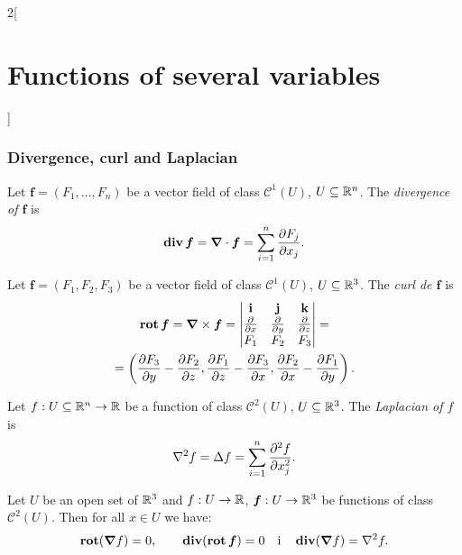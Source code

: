 \documentclass[../../../main.tex]{subfiles}
\begin{document}
\begin{multicols}{2}[\section{Functions of several variables}]
    \subsubsection*{Divergence, curl and Laplacian}
    \begin{definition}
        Let $\boldsymbol{f}=(F_1,\ldots, F_n)$ be a vector field of class $\mathcal{C}^1(U)$, $U\subseteq\mathbb{R}^n$. The \textit{divergence of $\boldsymbol{f}$} is $$\operatorname{\vb{div}}\boldsymbol{f}=\grad\cdot\boldsymbol{f}=\sum_{i=1}^n\frac{\partial F_j}{\partial x_j}.$$
    \end{definition}
    \begin{definition}
        Let $\boldsymbol{f}=(F_1,F_2,F_3)$ be a vector field of class $\mathcal{C}^1(U)$, $U\subseteq\mathbb{R}^3$. The \textit{curl de $\boldsymbol{f}$} is \begin{multline*}
            \operatorname{\vb{rot}}\boldsymbol{f}=\grad\times\boldsymbol{f}=\begin{vmatrix}
                \textbf{i}                  & \textbf{j}                  & \textbf{k}                  \\
                \frac{\partial}{\partial x} & \frac{\partial}{\partial y} & \frac{\partial}{\partial z} \\
                F_1                         & F_2                         & F_3                         \\
            \end{vmatrix}=\\=\left(\frac{\partial F_3}{\partial y}-\frac{\partial F_2}{\partial z},\frac{\partial F_1}{\partial z}-\frac{\partial F_3}{\partial x},\frac{\partial F_2}{\partial x}-\frac{\partial F_1}{\partial y}\right).
        \end{multline*}
    \end{definition}
    \begin{definition}
        Let $f:U\subseteq\mathbb{R}^n\rightarrow\mathbb{R} $ be a function of class $\mathcal{C}^2(U)$, $U\subseteq\mathbb{R}^3$. The \textit{Laplacian of $f$} is $$\nabla^2 f=\Delta f=\sum_{i=1}^n\frac{\partial^2 f}{\partial x_j^2}.$$
    \end{definition}
    \begin{prop}
        Let $U$ be an open set of $\mathbb{R}^3$ and $f:U\rightarrow\mathbb{R} $, $\boldsymbol{f}:U\rightarrow\mathbb{R}^3$ be functions of class $\mathcal{C}^2(U)$. Then for all $x\in U$ we have: $$\operatorname{\vb{rot}}(\grad f)=0,\qquad\operatorname{\vb{div}}(\operatorname{\vb{rot}}\boldsymbol{f})=0\quad\text{i}\quad\operatorname{\vb{div}}(\grad f)=\nabla^2 f.$$
    \end{prop}

\end{multicols}
\end{document}
